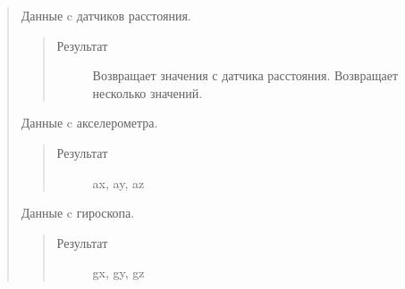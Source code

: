 \documentclass[a4paper,10pt,russian]{sphinxmanual}
\begin{document}
\begin{quote}
\begin{fulllineitems}
\begin{fulllineitems}
\begin{quote}
\begin{description}
\end{description}\end{quote}

\end{fulllineitems}


\begin{fulllineitems}
\label{\detokenize{programming/lua/lua:Sensors.range}}
Данные c датчиков расстояния.
\begin{quote}\begin{description}
\item[{Результат}] \leavevmode
Возвращает значения с датчика расстояния. Возвращает несколько значений.

\end{description}\end{quote}

\end{fulllineitems}


\begin{fulllineitems}
\label{\detokenize{programming/lua/lua:Sensors.accel}}
Данные c акселерометра.
\begin{quote}\begin{description}
\item[{Результат}] \leavevmode
ax, ay, az

\end{description}\end{quote}

\end{fulllineitems}


\begin{fulllineitems}
\label{\detokenize{programming/lua/lua:Sensors.gyro}}
Данные c гироскопа.
\begin{quote}\begin{description}
\item[{Результат}] \leavevmode
gx, gy, gz

\end{description}\end{quote}

\end{fulllineitems}


\end{fulllineitems}
\end{quote}
\end{document}
